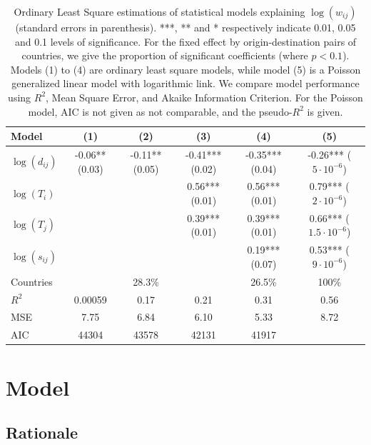 \documentclass[11pt]{article}
\begin{document}
\begin{table}[h]
\caption{Ordinary Least Square estimations of statistical models explaining $\log(w_{ij})$ (standard errors in parenthesis). ***, ** and * respectively indicate 0.01, 0.05 and 0.1 levels of significance. For the fixed effect by origin-destination pairs of countries, we give the proportion of significant coefficients (where $p<0.1$). Models (1) to (4) are ordinary least square models, while model (5) is a Poisson generalized linear model with logarithmic link. We compare model performance using $R^2$, Mean Square Error, and Akaike Information Criterion. For the Poisson model, AIC is not given as not comparable, and the pseudo-$R^2$ is given.\label{tab:reg}}
\medskip
\begin{tabular}{|l|c|c|c|c|c|}
\hline
Model  & (1) & (2) & (3) & (4) & (5) \\ 
\hline
$\log(d_{ij})$ &      -0.06** (0.03) &   -0.11** (0.05)  & -0.41*** (0.02)  & -0.35*** (0.04)  &  -0.26*** ($5\cdot 10^{-6}$) \\
$\log(T_i)$ &   &   & 0.56*** (0.01) &  0.56*** (0.01) & 0.79*** ($2\cdot 10^{-6}$) \\
$\log(T_j)$ &     &   & 0.39*** (0.01) &  0.39*** (0.01) & 0.66***  ($1.5\cdot 10^{-6}$) \\
$\log(s_{ij})$ &     &   &  &  0.19*** (0.07) & 0.53*** ($9\cdot 10^{-6}$)  \\
Countries &    &  28.3\% &   &  26.5\% & 100\% \\
\hline
$R^2$ &       0.00059   &  0.17 & 0.21 &  0.31  &  0.56 \\
MSE & 7.75 & 6.84 & 6.10 & 5.33 & 8.72 \\
AIC &        44304   &  43578  &  42131  & 41917 &   \\
\hline
\end{tabular}
\end{table}



\section{Model}

\subsection{Rationale}
\end{document}
